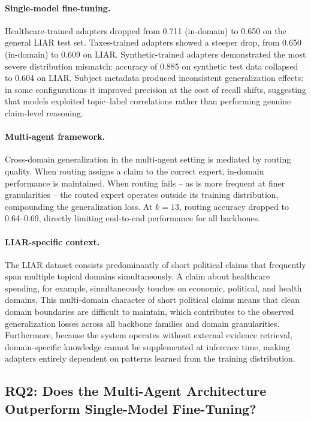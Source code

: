 \paragraph{Single-model fine-tuning.}
Healthcare-trained adapters dropped from 0.711 (in-domain) to 0.650 on the general LIAR test set. Taxes-trained adapters showed a steeper drop, from 0.650 (in-domain) to 0.609 on LIAR. Synthetic-trained adapters demonstrated the most severe distribution mismatch: accuracy of 0.885 on synthetic test data collapsed to 0.604 on LIAR. Subject metadata produced inconsistent generalization effects: in some configurations it improved precision at the cost of recall shifts, suggesting that models exploited topic--label correlations rather than performing genuine claim-level reasoning.

\paragraph{Multi-agent framework.}
Cross-domain generalization in the multi-agent setting is mediated by routing quality. When routing assigns a claim to the correct expert, in-domain performance is maintained. When routing fails -- as is more frequent at finer granularities -- the routed expert operates outside its training distribution, compounding the generalization loss. At $k{=}13$, routing accuracy dropped to 0.64--0.69, directly limiting end-to-end performance for all backbones.

\paragraph{LIAR-specific context.}
The LIAR dataset consists predominantly of short political claims that frequently span multiple topical domains simultaneously. A claim about healthcare spending, for example, simultaneously touches on economic, political, and health domains. This multi-domain character of short political claims means that clean domain boundaries are difficult to maintain, which contributes to the observed generalization losses across all backbone families and domain granularities. Furthermore, because the system operates without external evidence retrieval, domain-specific knowledge cannot be supplemented at inference time, making adapters entirely dependent on patterns learned from the training distribution.

\subsection{RQ2: Does the Multi-Agent Architecture Outperform Single-Model Fine-Tuning?}


